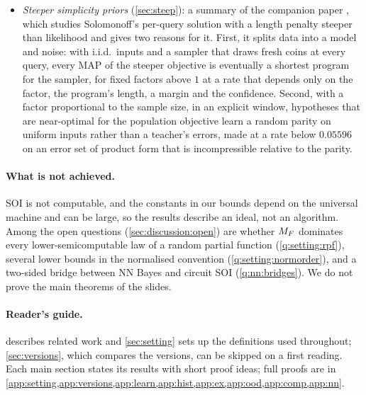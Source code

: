 \begin{itemize}[leftmargin=*]
\item \emph{Steeper simplicity priors} (\cref{sec:steep}): a summary of the companion paper \citep{claudeSFI2026steeper}, which studies Solomonoff's per-query solution with a length penalty steeper than likelihood and gives two reasons for it. First, it splits data into a model and noise: with i.i.d.\ inputs and a sampler that draws fresh coins at every query, every MAP of the steeper objective is eventually a shortest program for the sampler, for fixed factors above $1$ at a rate that depends only on the factor, the program's length, a margin and the confidence. Second, with a factor proportional to the sample size, in an explicit window, hypotheses that are near-optimal for the population objective learn a random parity on uniform inputs rather than a teacher's errors, made at a rate below $0.05596$ on an error set of product form that is incompressible relative to the parity.
\end{itemize}

\paragraph{What is not achieved.} SOI is not computable, and the constants in our bounds depend on the universal machine and can be large, so the results describe an ideal, not an algorithm. Among the open questions (\cref{sec:discussion:open}) are whether $M_{F}$ dominates every lower-semicomputable law of a random partial function (\cref{q:setting:rpf}), several lower bounds in the normalised convention (\cref{q:setting:normorder}), and a two-sided bridge between NN Bayes and circuit SOI (\cref{q:nn:bridges}). We do not prove the main theorems of the slides.

\paragraph{Reader's guide.}  describes related work and \cref{sec:setting} sets up the definitions used throughout; \cref{sec:versions}, which compares the versions, can be skipped on a first reading. Each main section states its results with short proof ideas; full proofs are in \cref{app:setting,app:versions,app:learn,app:hist,app:ex,app:ood,app:comp,app:nn}.
